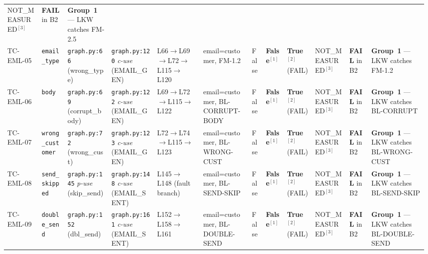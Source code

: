 \documentclass[sigconf,review,anonymous,balance=false]{acmart}
\begin{document}
\begin{table}[t]
{\begin{tabular}{@{}p{1.1cm}p{1.75cm}p{2.05cm}p{2.25cm}p{2.7cm}p{2.05cm}p{1.7cm}p{1.45cm}p{1.85cm}p{2.5cm}p{2.2cm}p{2.85cm}@{}}
  NOT\_MEASURED$^{[3]}$ &
  \textbf{FAIL} in B2 &
  \textbf{Group~1} --- LKW catches FM-2.5 \\[4pt]
TC-EML-05 &
  \texttt{email\_type} &
  \texttt{graph.py:66} (wrong\_type) &
  \texttt{graph.py:120} \emph{c-use} (EMAIL\_GEN) &
  L66$\to$L69$\to$L72$\to$L115$\to$L120 &
  email=customer, FM-1.2 &
  False &
  \textbf{False}$^{[1]}$ &
  \textbf{True}$^{[2]}$ (FAIL) &
  NOT\_MEASURED$^{[3]}$ &
  \textbf{FAIL} in B2 &
  \textbf{Group~1} --- LKW catches FM-1.2 \\[4pt]
TC-EML-06 &
  \texttt{body} &
  \texttt{graph.py:69} (corrupt\_body) &
  \texttt{graph.py:122} \emph{c-use} (EMAIL\_GEN) &
  L69$\to$L72$\to$L115$\to$L122 &
  email=customer, BL-CORRUPT-BODY &
  False &
  \textbf{False}$^{[1]}$ &
  \textbf{True}$^{[2]}$ (FAIL) &
  NOT\_MEASURED$^{[3]}$ &
  \textbf{FAIL} in B2 &
  \textbf{Group~1} --- LKW catches BL-CORRUPT \\[4pt]
TC-EML-07 &
  \texttt{wrong\_customer} &
  \texttt{graph.py:72} (wrong\_cust) &
  \texttt{graph.py:123} \emph{c-use} (EMAIL\_GEN) &
  L72$\to$L74$\to$L115$\to$L123 &
  email=customer, BL-WRONG-CUST &
  False &
  \textbf{False}$^{[1]}$ &
  \textbf{True}$^{[2]}$ (FAIL) &
  NOT\_MEASURED$^{[3]}$ &
  \textbf{FAIL} in B2 &
  \textbf{Group~1} --- LKW catches BL-WRONG-CUST \\[4pt]
TC-EML-08 &
  \texttt{send\_skipped} &
  \texttt{graph.py:145} \emph{p-use} (skip\_send) &
  \texttt{graph.py:148} \emph{c-use} (EMAIL\_SENT) &
  L145$\to$L148 (fault branch) &
  email=customer, BL-SEND-SKIP &
  False &
  \textbf{False}$^{[1]}$ &
  \textbf{True}$^{[2]}$ (FAIL) &
  NOT\_MEASURED$^{[3]}$ &
  \textbf{FAIL} in B2 &
  \textbf{Group~1} --- LKW catches BL-SEND-SKIP \\[4pt]
TC-EML-09 &
  \texttt{double\_send} &
  \texttt{graph.py:152} (dbl\_send) &
  \texttt{graph.py:161} \emph{c-use} (EMAIL\_SENT) &
  L152$\to$L158$\to$L161 &
  email=customer, BL-DOUBLE-SEND &
  False &
  \textbf{False}$^{[1]}$ &
  \textbf{True}$^{[2]}$ (FAIL) &
  NOT\_MEASURED$^{[3]}$ &
  \textbf{FAIL} in B2 &
  \textbf{Group~1} --- LKW catches BL-DOUBLE-SEND \\
\bottomrule
\end{tabular}}


\end{table}
\end{document}
